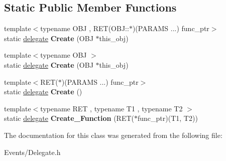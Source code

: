 \subsection*{Static Public Member Functions}
\begin{DoxyCompactItemize}
\item 
\mbox{\label{classdelegate_3_01RET_07PARAMS_01_8_8_8_08_4_a4689ea2cf4c98e2b35c55b0c2e3c6d88}} 
{\footnotesize template$<$typename O\+BJ , R\+E\+T(\+O\+B\+J\+::$\ast$)(\+P\+A\+R\+A\+M\+S ...) func\+\_\+ptr$>$ }\\static \hyperlink{classdelegate}{delegate} {\bfseries Create} (O\+BJ $\ast$this\+\_\+obj)
\item 
\mbox{\label{classdelegate_3_01RET_07PARAMS_01_8_8_8_08_4_ad4f80bd7793cb87813c52cc194c8094c}} 
{\footnotesize template$<$typename O\+BJ $>$ }\\static \hyperlink{classdelegate}{delegate} {\bfseries Create} (O\+BJ $\ast$this\+\_\+obj)
\item 
\mbox{\label{classdelegate_3_01RET_07PARAMS_01_8_8_8_08_4_af0261e051f3a0a3f28657e12bd260a53}} 
{\footnotesize template$<$R\+E\+T($\ast$)(\+P\+A\+R\+A\+M\+S ...) func\+\_\+ptr$>$ }\\static \hyperlink{classdelegate}{delegate} {\bfseries Create} ()
\item 
\mbox{\label{classdelegate_3_01RET_07PARAMS_01_8_8_8_08_4_ad3cc04c605907ecd0ce7afa3b205b07f}} 
{\footnotesize template$<$typename R\+ET , typename T1 , typename T2 $>$ }\\static \hyperlink{classdelegate}{delegate} {\bfseries Create\+\_\+\+Function} (R\+ET($\ast$func\+\_\+ptr)(T1, T2))
\end{DoxyCompactItemize}


The documentation for this class was generated from the following file\+:\begin{DoxyCompactItemize}
\item 
Events/Delegate.\+h\end{DoxyCompactItemize}
